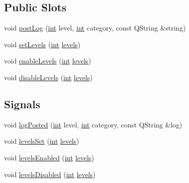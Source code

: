 \subsection*{Public Slots}
\begin{DoxyCompactItemize}
\item 
void \mbox{\hyperlink{class_q_g_b_a_1_1_log_controller_a92daac6ce0f52df639ee8911d0de82c7}{post\+Log}} (\mbox{\hyperlink{ioapi_8h_a787fa3cf048117ba7123753c1e74fcd6}{int}} level, \mbox{\hyperlink{ioapi_8h_a787fa3cf048117ba7123753c1e74fcd6}{int}} category, const Q\+String \&string)
\item 
void \mbox{\hyperlink{class_q_g_b_a_1_1_log_controller_a2aedba693013b937e0020396913db8fb}{set\+Levels}} (\mbox{\hyperlink{ioapi_8h_a787fa3cf048117ba7123753c1e74fcd6}{int}} \mbox{\hyperlink{class_q_g_b_a_1_1_log_controller_ac08583e6a38da30e249e8b4854425a54}{levels}})
\item 
void \mbox{\hyperlink{class_q_g_b_a_1_1_log_controller_ade271ceb4e1069fb77daaaffe5463300}{enable\+Levels}} (\mbox{\hyperlink{ioapi_8h_a787fa3cf048117ba7123753c1e74fcd6}{int}} \mbox{\hyperlink{class_q_g_b_a_1_1_log_controller_ac08583e6a38da30e249e8b4854425a54}{levels}})
\item 
void \mbox{\hyperlink{class_q_g_b_a_1_1_log_controller_aeabecdc38896b1115fc1e87ae6fcfd2a}{disable\+Levels}} (\mbox{\hyperlink{ioapi_8h_a787fa3cf048117ba7123753c1e74fcd6}{int}} \mbox{\hyperlink{class_q_g_b_a_1_1_log_controller_ac08583e6a38da30e249e8b4854425a54}{levels}})
\end{DoxyCompactItemize}
\subsection*{Signals}
\begin{DoxyCompactItemize}
\item 
void \mbox{\hyperlink{class_q_g_b_a_1_1_log_controller_ae7c77f28b56b06f90761c3ecae19f2f0}{log\+Posted}} (\mbox{\hyperlink{ioapi_8h_a787fa3cf048117ba7123753c1e74fcd6}{int}} level, \mbox{\hyperlink{ioapi_8h_a787fa3cf048117ba7123753c1e74fcd6}{int}} category, const Q\+String \&log)
\item 
void \mbox{\hyperlink{class_q_g_b_a_1_1_log_controller_ac1dea8ca81dabf4fdf0d3910b09c9677}{levels\+Set}} (\mbox{\hyperlink{ioapi_8h_a787fa3cf048117ba7123753c1e74fcd6}{int}} \mbox{\hyperlink{class_q_g_b_a_1_1_log_controller_ac08583e6a38da30e249e8b4854425a54}{levels}})
\item 
void \mbox{\hyperlink{class_q_g_b_a_1_1_log_controller_aaf506f4ff2d1925fb1d7a9541de3fc7a}{levels\+Enabled}} (\mbox{\hyperlink{ioapi_8h_a787fa3cf048117ba7123753c1e74fcd6}{int}} \mbox{\hyperlink{class_q_g_b_a_1_1_log_controller_ac08583e6a38da30e249e8b4854425a54}{levels}})
\item 
void \mbox{\hyperlink{class_q_g_b_a_1_1_log_controller_a768307fc0e3af09388a3c3b0ff4b9a8e}{levels\+Disabled}} (\mbox{\hyperlink{ioapi_8h_a787fa3cf048117ba7123753c1e74fcd6}{int}} \mbox{\hyperlink{class_q_g_b_a_1_1_log_controller_ac08583e6a38da30e249e8b4854425a54}{levels}})
\end{DoxyCompactItemize}

